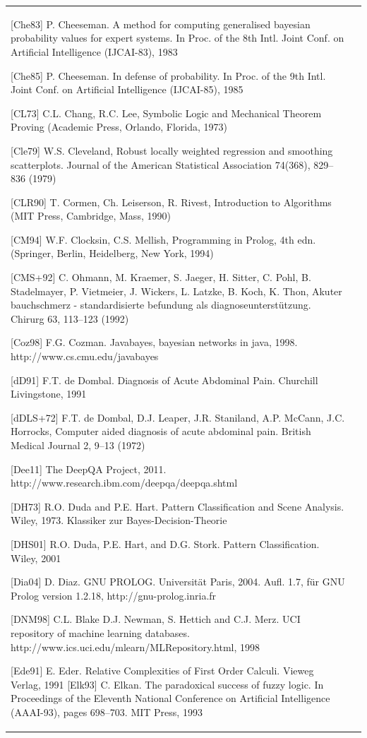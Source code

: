 \documentclass[10pt]{book}
\begin{document}
\begin{tabular}{|l|l|}
[Che83] P. Cheeseman. A method for computing generalised bayesian probability values for expert systems. In Proc. of the 8th Intl. Joint Conf. on Artificial Intelligence (IJCAI-83), 1983

[Che85] P. Cheeseman. In defense of probability. In Proc. of the 9th Intl. Joint Conf. on Artificial Intelligence (IJCAI-85), 1985

[CL73] C.L. Chang, R.C. Lee, Symbolic Logic and Mechanical Theorem Proving (Academic Press, Orlando, Florida, 1973)

[Cle79] W.S. Cleveland, Robust locally weighted regression and smoothing scatterplots. Journal of the American Statistical Association 74(368), 829–836 (1979)

[CLR90] T. Cormen, Ch. Leiserson, R. Rivest, Introduction to Algorithms (MIT Press, Cambridge, Mass, 1990)

[CM94] W.F. Clocksin, C.S. Mellish, Programming in Prolog, 4th edn. (Springer, Berlin, Heidelberg, New York, 1994)

[CMS+92] C. Ohmann, M. Kraemer, S. Jaeger, H. Sitter, C. Pohl, B. Stadelmayer, P. Vietmeier, J. Wickers, L. Latzke, B. Koch, K. Thon, Akuter bauchschmerz - standardisierte befundung als diagnoseunterstützung. Chirurg 63, 113–123 (1992)

[Coz98] F.G. Cozman. Javabayes, bayesian networks in java, 1998. http://www.cs.cmu.edu/javabayes

[dD91] F.T. de Dombal. Diagnosis of Acute Abdominal Pain. Churchill Livingstone, 1991

[dDLS+72] F.T. de Dombal, D.J. Leaper, J.R. Staniland, A.P. McCann, J.C. Horrocks, Computer aided diagnosis of acute abdominal pain. British Medical Journal 2, 9–13 (1972)

[Dee11] The DeepQA Project, 2011. http://www.research.ibm.com/deepqa/deepqa.shtml

[DH73] R.O. Duda and P.E. Hart. Pattern Classification and Scene Analysis. Wiley, 1973. Klassiker zur Bayes-Decision-Theorie

[DHS01] R.O. Duda, P.E. Hart, and D.G. Stork. Pattern Classification. Wiley, 2001

[Dia04] D. Diaz. GNU PROLOG. Universität Paris, 2004. Aufl. 1.7, für GNU Prolog version 1.2.18, http://gnu-prolog.inria.fr

[DNM98] C.L. Blake D.J. Newman, S. Hettich and C.J. Merz. UCI repository of machine learning databases. http://www.ics.uci.edu/mlearn/MLRepository.html, 1998

[Ede91] E. Eder. Relative Complexities of First Order Calculi. Vieweg Verlag, 1991
[Elk93] C. Elkan. The paradoxical success of fuzzy logic. In Proceedings of the Eleventh National Conference on Artificial Intelligence (AAAI-93), pages 698–703. MIT Press, 1993


\end{tabular}
\end{document}
